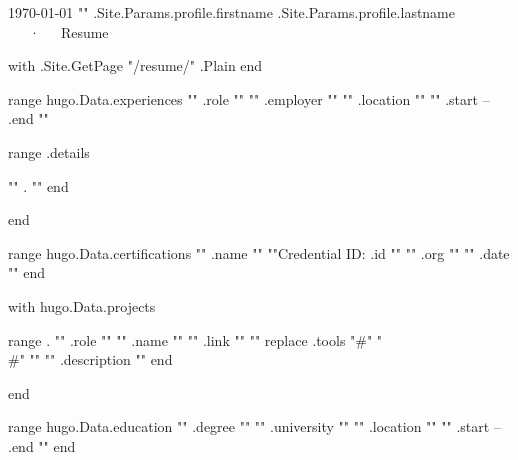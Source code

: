 \documentclass[11pt, a4paper]{awesome-cv}
\begin{document}
\makecvheader[C]

\makecvfooter
  {\today}
  {{"{"}}{{ .Site.Params.profile.firstname }} {{ .Site.Params.profile.lastname }}~~~·~~~Resume}
  {\thepage}

\begin{cvparagraph}

{{ with .Site.GetPage "/resume/" }}{{ .Plain }}{{ end }}

\end{cvparagraph}

\begin{cventries}

{{ range hugo.Data.experiences }}
  \cventry
    {{"{"}}{{ .role }}{{"}"}}
    {{"{"}}{{ .employer }}{{"}"}}
    {{"{"}}{{ .location }}{{"}"}}
    {{"{"}}{{ .start }} -- {{ .end }}{{"}"}}
    {
      \begin{cvitems}{{ range .details }}
        \item{{"{"}}{{ . }}{{"}"}}{{ end }}
      \end{cvitems}
    }

{{ end }}

\end{cventries}

\begin{cvhonors}
{{ range hugo.Data.certifications }}
  \cvhonor
    {{"{"}}{{ .name }}{{"}"}}
    {{"{"}}Credential ID: {{ .id }}{{"}"}}
    {{"{"}}{{ .org }}{{"}"}}
    {{"{"}}{{ .date }}{{"}"}}
{{ end }}

\end{cvhonors}

{{ with hugo.Data.projects }}
\begin{cventries}
{{ range . }}
  \cventry
    {{"{"}}{{ .role }}{{"}"}}
    {{"{"}}{{ .name }}{{"}"}}
    {{"{"}}{{ .link }}{{"}"}}
    {{"{"}}{{ replace .tools "#" "\\#" }}{{"}"}}
    {{"{"}}{{ .description }}{{"}"}}
{{ end }}

\end{cventries}
{{ end }}

\begin{cventries}
{{ range hugo.Data.education }}
  \cventry
    {{"{"}}{{ .degree }}{{"}"}}
    {{"{"}}{{ .university }}{{"}"}}
    {{"{"}}{{ .location }}{{"}"}}
    {{"{"}}{{ .start }} -- {{ .end }}{{"}"}}
    {
    }
{{ end }}

\end{cventries}

\end{document}
